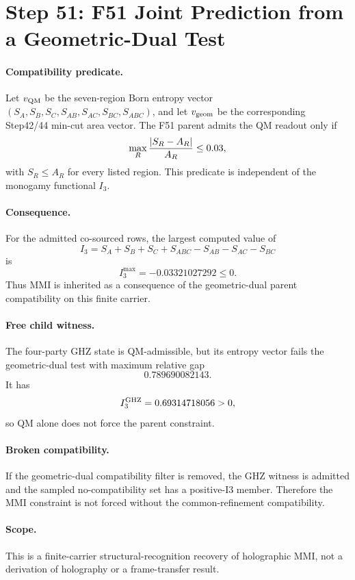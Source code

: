 \section*{Step 51: F51 Joint Prediction from a Geometric-Dual Test}

\paragraph{Compatibility predicate.}
Let \(v_{\rm QM}\) be the seven-region Born entropy vector
\((S_A,S_B,S_C,S_{AB},S_{AC},S_{BC},S_{ABC})\), and let
\(v_{\rm geom}\) be the corresponding Step42/44 min-cut area vector.
The F51 parent admits the QM readout only if
\[
  \max_R {|S_R-A_R|\over A_R} \le 0.03,
\]
with \(S_R\le A_R\) for every listed region.  This predicate is independent
of the monogamy functional \(I_3\).

\paragraph{Consequence.}
For the admitted co-sourced rows, the largest computed value of
\[
I_3=S_A+S_B+S_C+S_{ABC}-S_{AB}-S_{AC}-S_{BC}
\]
is
\[
  I_3^{\max}=-0.03321027292 \le 0.
\]
Thus MMI is inherited as a consequence of the geometric-dual parent
compatibility on this finite carrier.

\paragraph{Free child witness.}
The four-party GHZ state is QM-admissible, but its entropy vector fails the
geometric-dual test with maximum relative gap
\[
0.789690082143.
\]
It has
\[
I_3^{\rm GHZ}=0.69314718056 >0,
\]
so QM alone does not force the parent constraint.

\paragraph{Broken compatibility.}
If the geometric-dual compatibility filter is removed, the GHZ witness is
admitted and the sampled no-compatibility set has a positive-I3 member.
Therefore the MMI constraint is not forced without the common-refinement
compatibility.

\paragraph{Scope.}
This is a finite-carrier structural-recognition recovery of holographic MMI,
not a derivation of holography or a frame-transfer result.
